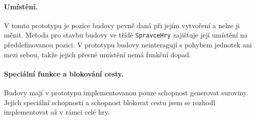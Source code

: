 \paragraph{Umístění.}
V tomto prototypu je pozice budovy pevně daná při jejím vytvoření a nelze ji měnit. Metoda pro stavbu budovy ve třídě \texttt{SpravceHry} zajišťuje její umístění na předdefinovanou pozici. V prototypu budovy neinteragují s pohybem jednotek ani mezi sebou, takže jejich přesné umístění nemá funkční dopad. 

\paragraph{Speciální funkce a blokování cesty.} Budovy mají v prototypu implementovanou pouze schopnost generovat suroviny. Jejich speciální schopnosti a schopnost blokovat cestu jsem se rozhodl implementovat až v rámci celé hry.